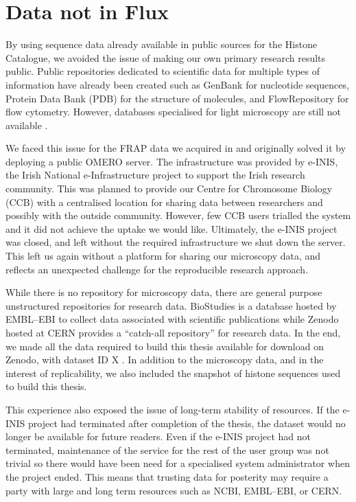 \section{Data not in Flux}

By using sequence data already available in public sources for the
Histone Catalogue, we avoided the issue
of making our own primary research results public.
Public repositories dedicated to scientific data
for multiple types of information have already been created such as GenBank for
nucleotide sequences, Protein Data Bank (PDB) for the structure of
molecules, and FlowRepository for flow cytometry.  However, databases
specialised for light microscopy are still not available
\citep{image-data-need-home}.

We faced this issue for the FRAP data
we acquired in  and originally solved it by deploying
a public OMERO server.
The infrastructure was provided by
e-INIS, the Irish National e-Infrastructure project to support the
Irish research community.
This was planned to provide our Centre for Chromosome Biology (CCB)
with a centralised location for sharing data between researchers
and possibly with the outside community.
However, few CCB users
trialled the system and it did not achieve the uptake we would like.
Ultimately, the e-INIS project was closed, and left without the
required infrastructure we
shut down the server.  This left us again without a platform for
sharing our microscopy data, and reflects an unexpected challenge for
the reproducible research approach.

While there is no repository for microscopy data, there are general
purpose unstructured repositories for research data.  BioStudies is a
database hosted by EMBL--EBI to collect data associated with
scientific publications \citep{mcentyre2015biostudies} while Zenodo
hosted at CERN provides a ``catch-all repository'' for research data.
In the end, we made all the data required to build this thesis
available for download on Zenodo, with dataset ID X
.  In addition to the microscopy data, and in the
interest of replicability, we also included the snapshot of histone
sequences used to build this thesis.

This experience also exposed the issue of long-term stability of
resources.  If the e-INIS project had terminated after completion of
the thesis, the dataset would no longer be available for future
readers.  Even if the e-INIS project had not terminated, maintenance
of the service for the rest of the user group was not trivial so there
would have been need for a specialised system administrator when the
project ended.  This means that trusting data for posterity may require
a party with large and long term resources such as NCBI, EMBL--EBI, or CERN.


